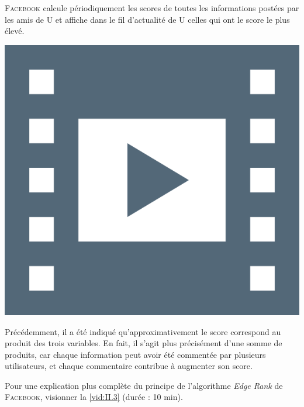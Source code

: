 \textsc{Facebook} calcule périodiquement les scores de toutes les informations postées par les amis de U et affiche dans le fil d'actualité de U celles qui ont le score le plus élevé.

\begin{marginvideo}
	\href{https://www.youtube.com/watch?v=1ParbwnSJpM}%
		{\includegraphics[width=\marginparwidth]{./Images/Pictograms/film-strip-dark-electric-blue.png}}%
\end{marginvideo}

Précédemment, il a été indiqué qu'approximativement le score correspond au produit des trois variables. En fait, il s’agit plus précisément d’une somme de produits, car chaque information peut avoir été commentée par plusieurs utilisateurs, et chaque commentaire contribue à augmenter son score.

Pour une explication plus complète du principe de l’algorithme \textit{Edge Rank} de \textsc{Facebook}, visionner la \cref{vid:II.3} (durée : 10 min).


